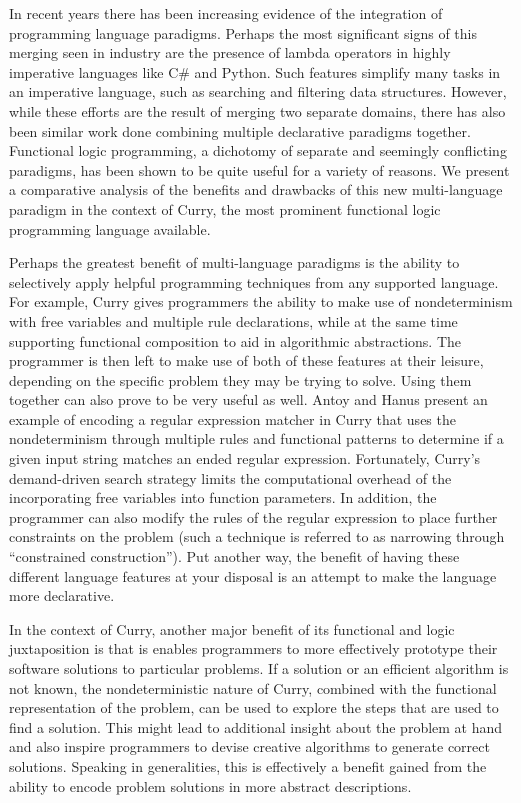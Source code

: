 \documentclass[12pt,letterpaper]{article}
\begin{document}
In recent years there has been increasing evidence of the integration of programming language paradigms.
Perhaps the most significant signs of this merging seen in industry are the presence of lambda 
operators in highly imperative languages like C\# and Python. Such features simplify many tasks in an
imperative language, such as searching and filtering data structures. However, while these efforts are the result of merging two separate domains, there has also been similar work done combining multiple 
declarative paradigms together. Functional logic programming, a dichotomy of separate and seemingly 
conflicting paradigms, has been shown to be quite useful for a variety of reasons. We present a
comparative analysis of the benefits and drawbacks of this new multi-language paradigm in the context of
Curry, the most prominent functional logic programming language available.

Perhaps the greatest benefit of multi-language paradigms is the ability to selectively apply helpful 
programming techniques from any supported language. For example, Curry gives programmers the ability to 
make use of nondeterminism with free variables and multiple rule declarations, while at the same time 
supporting functional composition to aid in algorithmic abstractions. The programmer is then left to 
make use of both of these features at their leisure, depending on the specific problem they may be 
trying to solve. Using them together can also prove to be very useful as well. Antoy and Hanus 
\cite{Antoy2010} present an example of encoding a regular expression matcher in Curry that uses the nondeterminism through
multiple rules and functional patterns to determine if a given input string matches an ended regular 
expression. Fortunately, Curry's demand-driven search strategy limits the computational overhead of 
the incorporating free variables into function parameters. In addition, the programmer can also modify
the rules of the regular expression to place further constraints on the problem (such a technique is 
referred to as narrowing through ``constrained construction''). Put another way, the benefit of 
having these different language features at your disposal is an attempt to make the language more 
declarative. 

In the context of Curry, another major benefit of its functional and logic juxtaposition is that 
is enables programmers to more effectively prototype their software solutions to particular problems.
If a solution or an efficient algorithm is not known, the nondeterministic nature of Curry, combined
with the functional representation of the problem, can be used to explore the steps that are used
to find a solution. This might lead to additional insight about the problem at hand and also inspire
programmers to devise creative algorithms to generate correct solutions. Speaking in generalities, 
this is effectively a benefit gained from the ability to encode problem solutions in more abstract 
descriptions.
\end{document}
